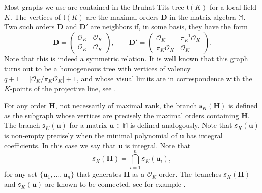 \documentclass{amsart}
\theoremstyle{definition}
\newcommand\alge{\mathbb{M}}
\newcommand\oink{\mathcal O}
\newcommand\Da{\mathbf{D}}
\newcommand\Ha{\mathbf{H}}
\newcommand\bmattrix[4]{\left(\begin{array}{cc}#1&#2\\#3&#4\end{array}\right)}
\begin{document}
Most graphs we use are contained in the Bruhat-Tits tree
$\mathfrak{t}(K)$ for a local field $K$. The vertices
of $\mathfrak{t}(K)$ are the maximal orders $\Da$
in the matrix algebra $\alge$.
Two such orders $\Da$ and $\Da'$ are neighbors if, in some
basis, they have the form
\begin{equation}\label{nba}
\Da=\bmattrix{\oink_K}{\oink_K}{\oink_K}{\oink_K},\qquad\Da'=
\bmattrix{\oink_K}{\pi_K^{-1}\oink_K}{\pi_K\oink_K}{\oink_K}.
\end{equation}
Note that this is indeed a symmetric relation.
It is well known that this graph turns out to be
a homogeneous tree with vertices of valency
$q+1=|\oink_K/\pi_K\oink_K|+1$, and
whose visual limits are in correspondence with
the $K$-points of the projective line,
see \cite[\S II.1]{trees}.



For any order $\Ha$, not necessarily of maximal rank,
the branch $\mathfrak{s}_K(\Ha)$ is defined as the 
subgraph whose vertices are precisely the maximal orders
containing $\Ha$. The branch 
$\mathfrak{s}_K(\mathbf{u})$ for a 
matrix $\mathbf{u}\in\alge$ is defined 
analogously. Note that 
$\mathfrak{s}_K(\mathbf{u})$ is non-empty
precisely when the minimal polynomial of
$\mathbf{u}$ has integral coefficients.
In this case we say that $\mathbf{u}$
is integral. Note  that
\begin{equation}\label{gens}
\mathfrak{s}_K(\Ha)=\bigcap_{i=1}^n\mathfrak{s}_K(\mathbf{u}_i),
\end{equation}
for any set $\{\mathbf{u}_1,\dots,\mathbf{u}_n\}$ 
that generates $\Ha$
as a $\oink_K$-order. The branches $\mathfrak{s}_K(\Ha)$ 
and $\mathfrak{s}_K(\mathbf{u})$ are known to be connected,
see for example \cite[Prop. 2.3]{Eichler2}.
\end{document}
